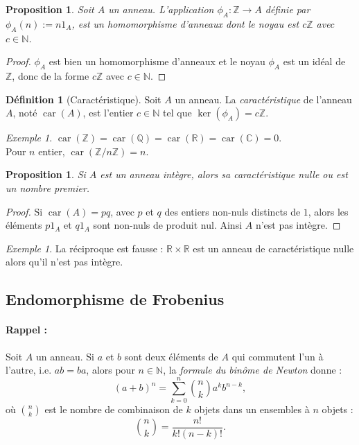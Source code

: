 \documentclass[a4paper, titlepage]{article}
\newtheorem{prop}[theo]{Proposition}
\theoremstyle{definition}
\newtheorem{defi}[theo]{Définition}
\theoremstyle{remark}
\newtheorem{exem}[theo]{Exemple}
\def\N{\mathbb N}
\def\Z{\mathbb Z}
\def\Q{\mathbb Q}
\def\R{\mathbb R}
\def\C{\mathbb C}
\def\car{\operatorname{car}}
\begin{document}
\begin{prop}
Soit $A$ un anneau. L'application $\phi_A : \Z \rightarrow A$ définie par $\phi_A(n) := n1_A$, est un homomorphisme d'anneaux dont le noyau est $c\Z$ avec $c\in \N$.
\end{prop}

\begin{proof}
$\phi_A$ est bien un homomorphisme d'anneaux et le noyau $\phi_A$ est un idéal de $\Z$, donc de la forme $c\Z$ avec $c\in\N$.
\end{proof}

\begin{defi}[Caractéristique]
Soit $A$ un anneau. La \textit{caractéristique} de l'anneau $A$, noté $\car(A)$, est l'entier $c\in\N$ tel que $\ker(\phi_A) = c\Z$.
\end{defi}

\begin{exem}
$\car(\Z) = \car(\Q) =\car(\R) =\car(\C) = 0$. \\
Pour $n$ entier, $\car(\Z/n\Z) = n$.
\end{exem}

\begin{prop}\label{caracIntegre}
Si $A$ est un anneau intègre, alors sa caractéristique nulle ou est un nombre premier.
\end{prop}

\begin{proof}
Si $\car(A) = pq$, avec $p$ et $q$ des entiers non-nuls distincts de $1$, alors les éléments $p1_A$ et $q1_A$ sont non-nuls de produit nul. Ainsi $A$ n'est pas intègre.
\end{proof}

\begin{exem}
La réciproque est fausse : $\R\times\R$ est un anneau de caractéristique nulle alors qu'il n'est pas intègre.
\end{exem}

\subsection{Endomorphisme de Frobenius}

\paragraph*{Rappel :} Soit $A$ un anneau. Si $a$ et $b$ sont deux éléments de $A$ qui commutent l'un à l'autre, i.e. $ab = ba$, alors pour $n \in \N$, la \textit{formule du binôme de Newton} donne :
$$(a+b)^n = \sum_{k=0}^n \binom{n}{k} a^kb^{n-k},$$
où $\binom{n}{k}$ est le nombre de combinaison de $k$ objets dans un ensembles à $n$ objets : $$\binom{n}{k} = \frac{n!}{k!(n-k)!}.$$
\end{document}
